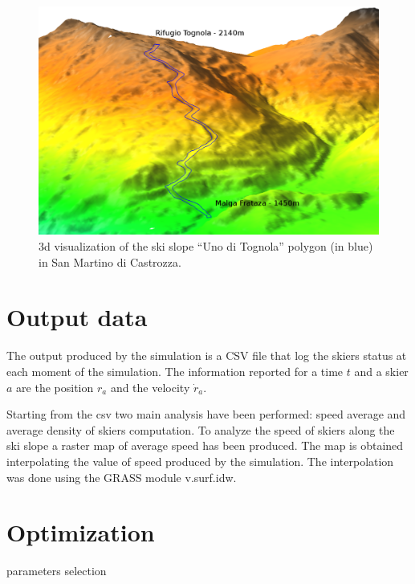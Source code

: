 \documentclass[12pt,a4paper,twoside]{book}
\begin{document}
\begin{figure}[!ht]
  \begin{center}
    \includegraphics[width=\textwidth]{images/uno_tognola_3d.eps}
    \caption{3d visualization of the ski slope ``Uno di Tognola'' polygon (in blue) in San Martino di Castrozza.}\label{uno_tognola_3d}
  \end{center}
\end{figure}

\section{Output data}
The output produced by the simulation is a CSV file that log the skiers status at each moment of the simulation. The information reported for a time $t$ and a skier $a$ are the position $r_a$ and the velocity $\dot{r}_a$.

Starting from the csv two main analysis have been performed: speed average and average density of skiers computation. To analyze the speed of skiers along the ski slope a raster map of average speed has been produced. The map is obtained interpolating the value of speed produced by the simulation. The interpolation was done using the GRASS module v.surf.idw.


\section{Optimization}

parameters selection





\end{document}
